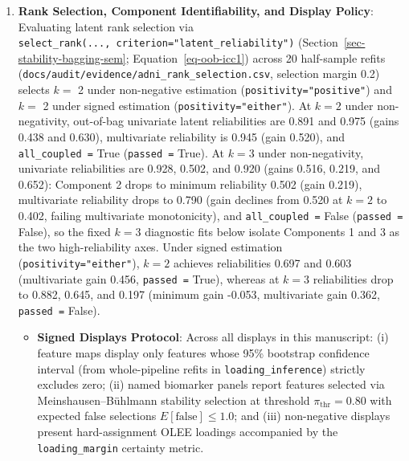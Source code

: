 \documentclass[
  10pt,
  letterpaper,
]{report}
\providecommand{\tightlist}{%
  \setlength{\itemsep}{0pt}\setlength{\parskip}{0pt}}
\begin{document}
\begin{enumerate}
  \(\to\) 0.028). Unshuffled Random Forest scores are 1.0 to 4.8 times
  that of \texttt{PCA}.
\item
  \textbf{Rank Selection, Component Identifiability, and Display
  Policy}: Evaluating latent rank selection via
  \texttt{select\_rank(...,\ criterion="latent\_reliability")}
  (Section~\ref{sec-stability-bagging-sem}; Equation~\ref{eq-oob-icc1})
  across 20 half-sample refits
  (\texttt{docs/audit/evidence/adni\_rank\_selection.csv}, selection
  margin 0.2) selects \(k =\) 2 under non-negative estimation
  (\texttt{positivity="positive"}) and \(k =\) 2 under signed estimation
  (\texttt{positivity="either"}). At \(k = 2\) under non-negativity,
  out-of-bag univariate latent reliabilities are 0.891 and 0.975 (gains
  0.438 and 0.630), multivariate reliability is 0.945 (gain 0.520), and
  \texttt{all\_coupled\ =} True (\texttt{passed\ =} True). At \(k = 3\)
  under non-negativity, univariate reliabilities are 0.928, 0.502, and
  0.920 (gains 0.516, 0.219, and 0.652): Component 2 drops to minimum
  reliability 0.502 (gain 0.219), multivariate reliability drops to
  0.790 (gain declines from 0.520 at \(k = 2\) to 0.402, failing
  multivariate monotonicity), and \texttt{all\_coupled\ =} False
  (\texttt{passed\ =} False), so the fixed \(k = 3\) diagnostic fits
  below isolate Components 1 and 3 as the two high-reliability axes.
  Under signed estimation (\texttt{positivity="either"}), \(k = 2\)
  achieves reliabilities 0.697 and 0.603 (multivariate gain 0.456,
  \texttt{passed\ =} True), whereas at \(k = 3\) reliabilities drop to
  0.882, 0.645, and 0.197 (minimum gain -0.053, multivariate gain 0.362,
  \texttt{passed\ =} False).

  \begin{itemize}
  \tightlist
  \item
    \textbf{Signed Displays Protocol}: Across all displays in this
    manuscript: (i) feature maps display only features whose 95\%
    bootstrap confidence interval (from whole-pipeline refits in
    \texttt{loading\_inference}) strictly excludes zero; (ii) named
    biomarker panels report features selected via Meinshausen--Bühlmann
    stability selection at threshold \(\pi_{\text{thr}} = 0.80\) with
    expected false selections \(E[\text{false}] \le 1.0\); and (iii)
    non-negative displays present hard-assignment OLEE loadings
    accompanied by the \texttt{loading\_margin} certainty metric.
  \end{itemize}
\end{enumerate}
\end{document}

